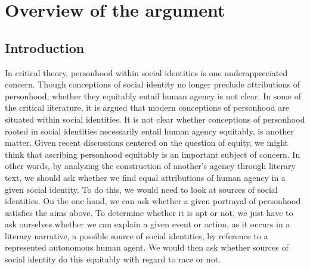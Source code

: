 \documentclass[phdthesis,12pt,final]{wuthesis}
\theoremstyle{definition}
\theoremstyle{definition}
\theoremstyle{definition}
\theoremstyle{definition}
\theoremstyle{remark}
\begin{document}
\section{Overview of the argument}\label{overview-of-the-argument}

\begin{Shaded}
\begin{Highlighting}[]

\end{Highlighting}
\end{Shaded}

\subsection*{Introduction}\label{introduction-2}

In critical theory, personhood within social identities is one underappreciated concern. Though conceptions of social identity no longer preclude attributions of personhood, whether they equitably entail human agency is not clear. In some of the critical literature, it is argued that modern conceptions of personhood are situated within social identities. It is not clear whether conceptions of personhood rooted in social identities necessarily entail human agency equitably, is another matter. Given recent discussions centered on the question of equity, we might think that ascribing personhood equitably is an important subject of concern. In other words, by analyzing the construction of another's agency through literary text, we should ask whether we find equal attributions of human agency in a given social identity. To do this, we would need to look at sources of social identities. On the one hand, we can ask whether a given portrayal of personhood satisfies the aims above. To determine whether it is apt or not, we just have to ask ourselves whether we can explain a given event or action, as it occurs in a literary narrative, a possible source of social identities, by reference to a represented autonomous human agent. We would then ask whether sources of social identity do this equitably with regard to race or not.
\end{document}
